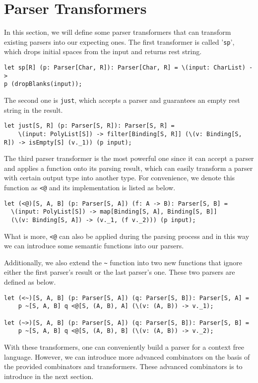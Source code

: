 \section{Parser Transformers}
In this section, we will define some parser transformers that can transform existing parsers into our expecting ones. The first transformer is called '\texttt{sp}', which drops initial spaces from the input and returns rest string.
\begin{lstlisting}
let sp[R] (p: Parser[Char, R]): Parser[Char, R] = \(input: CharList) ->
p (dropBlanks(input));
\end{lstlisting}
The second one is \texttt{just}, which accepts a parser and guarantees an empty rest string in the result.
\begin{lstlisting}
let just[S, R] (p: Parser[S, R]): Parser[S, R] =
    \(input: PolyList[S]) -> filter[Binding[S, R]] (\(v: Binding[S, R]) -> isEmpty[S] (v._1)) (p input);
\end{lstlisting}
The third parser transformer is the most powerful one since it can accept a parser and applies a function onto its parsing result, which can easily transform a parser with certain output type into another type. For convenience, we denote this function as \texttt{<@} and its implementation is listed as below.
\begin{lstlisting}
let (<@)[S, A, B] (p: Parser[S, A]) (f: A -> B): Parser[S, B] =
  \(input: PolyList[S]) -> map[Binding[S, A], Binding[S, B]]
  (\(v: Binding[S, A]) -> (v._1, (f v._2))) (p input);
\end{lstlisting}
What is more, \texttt{<@} can also be applied during the parsing process and in this way we can introduce some semantic functions into our parsers.

Additionally, we also extend the \texttt{\textasciitilde} function into two new functions that ignore either the first parser's result or the last parser's one. These two parsers are defined as below.
\begin{lstlisting}
let (<~)[S, A, B] (p: Parser[S, A]) (q: Parser[S, B]): Parser[S, A] =
	p ~[S, A, B] q <@[S, (A, B), A] (\(v: (A, B)) -> v._1);

let (~>)[S, A, B] (p: Parser[S, A]) (q: Parser[S, B]): Parser[S, B] =
	p ~[S, A, B] q <@[S, (A, B), B] (\(v: (A, B)) -> v._2);
\end{lstlisting}
With these transformers, one can conveniently build a parser for a context free language. However, we can introduce more advanced combinators on the basis of the provided combinators and transformers. These advanced combinators is to introduce in the next section.

